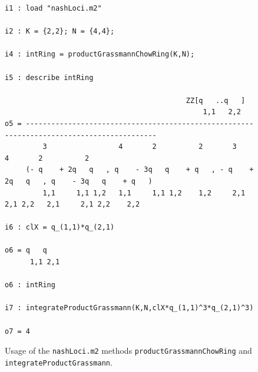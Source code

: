 \documentclass[12pt]{article}
\theoremstyle{definition}
\begin{document}
\begin{figure}[h]
\centering
\begin{tcolorbox}[size=fbox,width=\linewidth,colback=blue!5!white,colframe=blue!75!black]
\begin{Verbatim}[fontsize=\scriptsize,commandchars=\\\{\}]
i1 : load "nashLoci.m2"

i2 : K = {2,2}; N = {4,4};

i4 : intRing = productGrassmannChowRing(K,N);

i5 : describe intRing

                                           ZZ[q   ..q   ]
                                               1,1   2,2
o5 = ------------------------------------------------------------------------------------------
         3                 4       2          2       3                 4       2          2
     (- q    + 2q   q   , q    - 3q   q    + q   , - q    + 2q   q   , q    - 3q   q    + q   )
         1,1     1,1 1,2   1,1     1,1 1,2    1,2     2,1     2,1 2,2   2,1     2,1 2,2    2,2

i6 : clX = q_(1,1)*q_(2,1)

o6 = q   q
      1,1 2,1

o6 : intRing

i7 : integrateProductGrassmann(K,N,clX*q_(1,1)^3*q_(2,1)^3)

o7 = 4
\end{Verbatim}
\end{tcolorbox}
\caption{Usage of the {\tt nashLoci.m2} methods {\tt productGrassmannChowRing} and {\tt integrateProductGrassmann}.}\label{fig: productGrassmannChowRing}
\end{figure}
\end{document}
